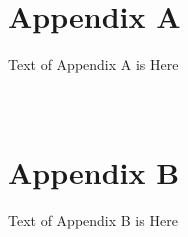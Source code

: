 \newpage
\appendix
\section*{\\Appendix A} \label{App:AppendixA}

Text of Appendix A is Here

\newpage
\section*{\\Appendix B} \label{App:AppendixB}

Text of Appendix B is Here